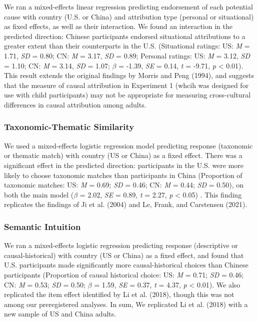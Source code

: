 \documentclass[
  man,floatsintext]{apa6}
\begin{document}
We ran a mixed-effects linear regression predicting endorsement of each potential cause with country (U.S. or China) and attribution type (personal or situational) as fixed effects, as well as their interaction. We found an interaction in the predicted direction: Chinese participants endorsed situational attributions to a greater extent than their counterparts in the U.S. (Situational ratings: US: \emph{M} = 1.71, \emph{SD} = 0.80; CN: \emph{M} = 3.17, \emph{SD} = 0.89; Personal ratings: US: \emph{M} = 3.12, \emph{SD} = 1.10; CN: \emph{M} = 3.14, \emph{SD} = 1.07; \(\beta\) = -1.39, \emph{SE} = 0.14, \emph{t} = -9.71, \emph{p} \textless{} 0.01). This result extends the original findings by Morris and Peng (1994), and suggests that the measure of causal attribution in Experiment 1 (whcih was designed for use with child participants) may not be appropriate for measuring cross-cultural differences in causal attribution among adults.

\hypertarget{taxonomic-thematic-similarity}{%
\subsubsection{Taxonomic-Thematic Similarity}\label{taxonomic-thematic-similarity}}

We used a mixed-effects logistic regression model predicting response (taxonomic or thematic match) with country (US or China) as a fixed effect. There was a significant effect in the predicted direction: participants in the U.S. were more likely to choose taxonomic matches than participants in China (Proportion of taxonomic matches: US: \emph{M} = 0.69; \emph{SD} = 0.46; CN: \emph{M} = 0.44; \emph{SD} = 0.50), on both the main model (\(\beta\) = 2.02, \emph{SE} = 0.89, \emph{t} = 2.27, \emph{p} \textless{} 0.05) . This finding replicates the findings of Ji et al. (2004) and Le, Frank, and Carstensen (2021).

\hypertarget{semantic-intuition-1}{%
\subsubsection{Semantic Intuition}\label{semantic-intuition-1}}

We ran a mixed-effects logistic regression predicting response (descriptive or causal-historical) with country (US or China) as a fixed effect, and found that U.S. participants made significantly more causal-historical choices than Chinese participants (Proportion of causal historical choice: US: \emph{M} = 0.71; \emph{SD} = 0.46; CN: \emph{M} = 0.53; \emph{SD} = 0.50; \(\beta\) = 1.59, \emph{SE} = 0.37, \emph{t} = 4.37, \emph{p} \textless{} 0.01). We also replicated the item effect identified by Li et al. (2018), though this was not among our preregistered analyses. In sum, We replicated Li et al. (2018) with a new sample of US and China adults.
\end{document}
